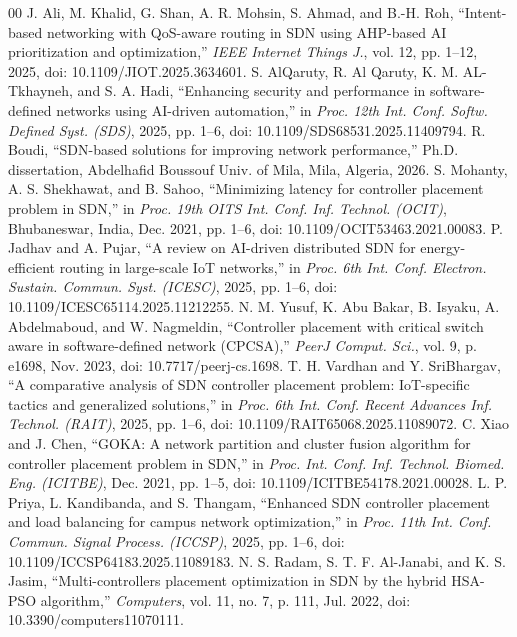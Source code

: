 \documentclass[conference]{IEEEtran}
\begin{document}
\begin{thebibliography}{00}
\setlength{\itemsep}{-1.5pt}
 J. Ali, M. Khalid, G. Shan, A. R. Mohsin, S. Ahmad, and B.-H. Roh, ``Intent-based networking with QoS-aware routing in SDN using AHP-based AI prioritization and optimization,'' \textit{IEEE Internet Things J.}, vol. 12, pp. 1--12, 2025, doi: 10.1109/JIOT.2025.3634601.
 S. AlQaruty, R. Al Qaruty, K. M. AL-Tkhayneh, and S. A. Hadi, ``Enhancing security and performance in software-defined networks using AI-driven automation,'' in \textit{Proc. 12th Int. Conf. Softw. Defined Syst. (SDS)}, 2025, pp. 1--6, doi: 10.1109/SDS68531.2025.11409794.
 R. Boudi, ``SDN-based solutions for improving network performance,'' Ph.D. dissertation, Abdelhafid Boussouf Univ. of Mila, Mila, Algeria, 2026.
 S. Mohanty, A. S. Shekhawat, and B. Sahoo, ``Minimizing latency for controller placement problem in SDN,'' in \textit{Proc. 19th OITS Int. Conf. Inf. Technol. (OCIT)}, Bhubaneswar, India, Dec. 2021, pp. 1--6, doi: 10.1109/OCIT53463.2021.00083.
 P. Jadhav and A. Pujar, ``A review on AI-driven distributed SDN for energy-efficient routing in large-scale IoT networks,'' in \textit{Proc. 6th Int. Conf. Electron. Sustain. Commun. Syst. (ICESC)}, 2025, pp. 1--6, doi: 10.1109/ICESC65114.2025.11212255.
 N. M. Yusuf, K. Abu Bakar, B. Isyaku, A. Abdelmaboud, and W. Nagmeldin, ``Controller placement with critical switch aware in software-defined network (CPCSA),'' \textit{PeerJ Comput. Sci.}, vol. 9, p. e1698, Nov. 2023, doi: 10.7717/peerj-cs.1698.
 T. H. Vardhan and Y. SriBhargav, ``A comparative analysis of SDN controller placement problem: IoT-specific tactics and generalized solutions,'' in \textit{Proc. 6th Int. Conf. Recent Advances Inf. Technol. (RAIT)}, 2025, pp. 1--6, doi: 10.1109/RAIT65068.2025.11089072.
 C. Xiao and J. Chen, ``GOKA: A network partition and cluster fusion algorithm for controller placement problem in SDN,'' in \textit{Proc. Int. Conf. Inf. Technol. Biomed. Eng. (ICITBE)}, Dec. 2021, pp. 1--5, doi: 10.1109/ICITBE54178.2021.00028.
 L. P. Priya, L. Kandibanda, and S. Thangam, ``Enhanced SDN controller placement and load balancing for campus network optimization,'' in \textit{Proc. 11th Int. Conf. Commun. Signal Process. (ICCSP)}, 2025, pp. 1--6, doi: 10.1109/ICCSP64183.2025.11089183.
 N. S. Radam, S. T. F. Al-Janabi, and K. S. Jasim, ``Multi-controllers placement optimization in SDN by the hybrid HSA-PSO algorithm,'' \textit{Computers}, vol. 11, no. 7, p. 111, Jul. 2022, doi: 10.3390/computers11070111.

\end{thebibliography}
\end{document}
